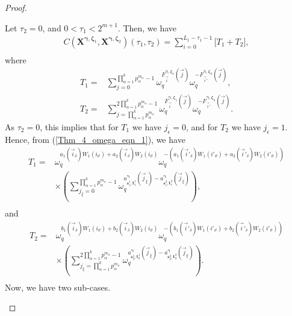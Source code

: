 \documentclass[10pt,a4paper]{amsart}
\theoremstyle{plain}
\begin{document}
\begin{proof}
\begin{mycases}
			\item  Let $\tau_2=0$, and $0 < \tau_1 < 2^{m+1}$. Then, we have
			\begin{equation}\label{eqn_T_sum}
				\begin{split}
					C\left( \mathbf{X}^{\bm{\gamma},\bm{\zeta}_1}, \mathbf{X}^{\bm{\gamma}, \bm{\zeta}_2} \right) (\tau_1, \tau_2) =  \sum_{i=0}^{L_1 -\tau_1-1} \bigg[ T_1 + T_2 \bigg],\\
				\end{split}
			\end{equation}
			where
			\begin{equation}
				\begin{split}
					T_1= & \sum_{j=0}^{\prod_{\alpha=1}^{k} p_\alpha^{m_\alpha} -1} \omega_q^{ 	F_{ \vec{i}}^{\bm{\gamma}, \bm{\zeta}_1} (\vec{j}) } \omega_q^{ 	-F_{ \vec{i}'}^{\bm{\gamma}, \bm{\zeta}_2} (\vec{j}) },\\
					T_2= & \sum_{j= \prod_{\alpha=1}^{k} p_\alpha^{m_\alpha}}^{2 \prod_{\alpha=1}^{k} p_\alpha^{m_\alpha} -1} \omega_q^{ 	F_{ \vec{i}}^{\bm{\gamma}, \bm{\zeta}_1} (\vec{j}) } \omega_q^{ 	-F_{ \vec{i}'}^{\bm{\gamma}, \bm{\zeta}_2} (\vec{j}) }.
				\end{split}
			\end{equation}
			As $\tau_2=0$, this implies that for $T_1$ we have $j_{\epsilon}=0$, and for $T_2$ we have $j_{\epsilon}=1$.
			Hence, from (\ref{Thm_4_omega_eqn_1}), we have
			\begin{equation}\label{eqn_W1W2_1}
				\begin{split}
					T_1= &\omega_q^{a_1(\vec{i}_{\delta}) W_1(i_\vartheta) + a_2(\vec{i}_{\delta}) W_2(i_\vartheta)} \omega_q^{- \left( a_1(\vec{i}'_{\delta}) W_1(i'_\vartheta) + a_2(\vec{i}'_{\delta}) W_2(i'_\vartheta) \right)}\\
					& \times \left( \sum_{j_{\xi}=0}^{\prod_{\alpha=1}^{k} p_\alpha^{m_\alpha} -1} \omega_q^{a_{\mathbf{s}_1^1,\mathbf{t}_1^1}^{\bm{\gamma}} (\vec{j}_{\xi})-a_{\mathbf{s}_1^2,\mathbf{t}_1^2}^{\bm{\gamma}} (\vec{j}_{\xi}) } \right),\\
				\end{split}
			\end{equation}
			and
			\begin{equation}\label{eqn_W1W2_2}
				\begin{split}
					T_2=& \omega_q^{b_1(\vec{i}_{\delta}) W_1(i_\vartheta) + b_2(\vec{i}_{\delta}) W_2(i_\vartheta)}  \omega_q^{- \left( b_1(\vec{i}'_{\delta}) W_1(i'_\vartheta) + b_2(\vec{i}'_{\delta}) W_2(i'_\vartheta) \right)}\\
					& \times \left( \sum_{j_{\xi}= \prod_{\alpha=1}^{k} p_\alpha^{m_\alpha}}^{2 \prod_{\alpha=1}^{k} p_\alpha^{m_\alpha} -1} \omega_q^{a_{\mathbf{s}_2^1,\mathbf{t}_2^1}^{\bm{\gamma}} (\vec{j}_{\xi})-a_{\mathbf{s}_2^2,\mathbf{t}_2^2}^{\bm{\gamma}} (\vec{j}_{\xi}) } \right).\\
				\end{split}
			\end{equation}
			Now, we have two sub-cases.
			

\end{mycases}
\end{proof}
\end{document}
